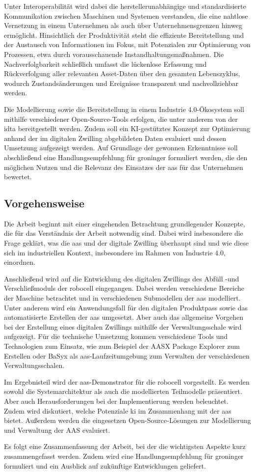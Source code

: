 Unter Interoperabilität wird dabei die herstellerunabhängige und standardisierte Kommunikation zwischen Maschinen und Systemen verstanden, die eine nahtlose Vernetzung in einem Unternehmen als auch über Unternehmensgrenzen hinweg ermöglicht.
Hinsichtlich der Produktivität steht die effiziente Bereitstellung und der Austausch von Informationen im Fokus, mit Potenzialen zur Optimierung von Prozessen, etwa durch vorausschauende Instandhaltungsmaßnahmen. 
Die Nachverfolgbarkeit schließlich umfasst die lückenlose Erfassung und Rückverfolgung aller relevanten Asset-Daten über den gesamten Lebenszyklus, wodurch Zustandsänderungen und Ereignisse transparent und nachvollziehbar werden.

Die Modellierung sowie die Bereitstellung in einem Industrie 4.0-Ökosystem soll mithilfe verschiedener Open-Source-Tools erfolgen, die unter anderem von der \ac{idta} bereitgestellt werden. 
Zudem soll ein KI-gestütztes Konzept zur Optimierung anhand der im digitalen Zwilling abgebildeten Daten evaluiert und dessen Umsetzung aufgezeigt werden. 
Auf Grundlage der gewonnen Erkenntnisse soll abschließend eine Handlungsempfehlung für groninger formuliert werden, die den möglichen Nutzen und die Relevanz des Einsatzes der \acs{aas} für das Unternehmen bewertet.

\subsection{Vorgehensweise}
Die Arbeit beginnt mit einer eingehenden Betrachtung grundlegender Konzepte, die für das Verständnis der Arbeit notwendig sind. 
Dabei wird insbesondere die Frage geklärt, was die \acs{aas} und der digitale Zwilling überhaupt sind und wie diese sich im industriellen Kontext, insbesondere im Rahmen von Industrie 4.0, einordnen.

Anschließend wird auf die Entwicklung des digitalen Zwillings des Abfüll -und Verschließmoduls der robocell eingegangen. 
Dabei werden verschiedene Bereiche der Maschine betrachtet und in verschiedenen Submodellen der \acs{aas} modelliert.
Unter anderem wird ein Anwendungsfall für den digitalen Produktpass sowie das automatisierte Erstellen der \acs{aas} umgesetzt.
Aber auch das allgemeine Vorgehen bei der Erstellung eines digitalen Zwillings mithilfe der Verwaltungsschale wird aufgezeigt.
Für die technische Umsetzung kommen verschiedene Tools und Technologien zum Einsatz, wie zum Beispiel der AASX Package Explorer zum Erstellen oder BaSyx als \acs{aas}-Laufzeitumgebung zum Verwalten der verschiedenen Verwaltungsschalen.

Im Ergebnisteil wird der \acs{aas}-Demonstrator für die robocell vorgestellt. Es werden sowohl die Systemarchitektur als auch die modellierten Teilmodelle präsentiert.
Aber auch Herausforderungen bei der Implementierung werden beleuchtet.
Zudem wird diskutiert, welche Potenziale \ac{ki} im Zusammenhang mit der \acs{aas} bietet.
Außerdem werden die eingesetzen Open-Source-Lösungen zur Modellierung und Verwaltung der AAS evaluiert.

Es folgt eine Zusammenfassung der Arbeit, bei der die wichtigsten Aspekte kurz zusammengefasst werden.
Zudem wird eine Handlungsempfehlung für groninger formuliert und ein Ausblick auf zukünftige Entwicklungen geliefert.